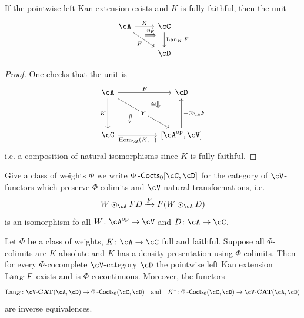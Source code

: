 \documentclass[a4paper,11pt,oneside,openany]{scrbook}
\begin{document}
\begin{lemma}
	If the pointwise left Kan extension exists and $ K $ is fully faithful, then the unit
	\begin{displaymath}
		\begin{tikzcd}
			\cA \arrow[r, "K"]\arrow[rd,"F"', 	""{name=F,marking,near start}] 	 &
			\cC \arrow[d, "{\Lan_K F}",		""{name=L,marking,above, near start}]	\\
			& \cD
			\arrow[Rightarrow, from=F, to=L, shorten <=10pt, shorten >=10pt, start anchor={north west}, end anchor={[yshift=1pt]}, "\eta_F"]
		\end{tikzcd}
	\end{displaymath}
\end{lemma}
\begin{proof}
	One checks that the unit is
	\begin{displaymath}
		\begin{tikzcd}[column sep = huge, row sep =huge]
			\cA
			\arrow[r,"F", ""{name=F, near end}]
			\arrow[d,"K"']
			\arrow[rd, "Y"description, ""{name=Y, near end}, ""{name=Z, near start}]
			&
			\cD
			\\
			\cC
			\arrow[r, "{\Hom_{\cA}(K,-)}"', ""{name=H, near start}]
			&
			\lbrack\cA^{\op},\cV\rbrack
			\arrow[u, "-\odot_\cA F"']
			\arrow[Rightarrow, from =F, to=Y, shorten <= 10pt, shorten >=10pt, "\iso"']
			\arrow[Rightarrow, from =Z, to=H, shorten <= 10pt, shorten >=10pt]
		\end{tikzcd}
	\end{displaymath}
	i.e. a composition of natural isomorphisms since $ K $ is fully faithful.
\end{proof}
\begin{defn}
	Give a class of weights $ \Phi $ we write $ \Phi\Cocts_0[\cC,\cD] $ for the category of $ \cV $-functors which preserve $ \Phi $-colimits and $ \cV $ natural transformations, i.e.
	\begin{displaymath}
		W\odot _\cA FD \xrightarrow{F}  F(W\odot_\cA D)
	\end{displaymath}
	is an isomorphism fo all $ W \from \cA ^{\op} \to \cV $ and $ D \from \cA \to \cC $.
\end{defn}
\begin{thm}
	Let $ \Phi $ be a class of weights, $ K \from \cA \to \cC $ full and faithful.
	Suppose all $ \Phi $-colimits are $ K $-absolute and $ K $ has a density presentation using $ \Phi $-colimits.
	Then for every $ \Phi $-cocomplete $ \cV $-category $ \cD $ the pointwise left Kan extension $ \operatorname{Lan}_K F $ exists and is $ \Phi $-cocontinuous.
	Moreover, the functors
	\begin{displaymath}
		\Lan_K \from \cV\text{-}\CAT(\cA,\cD) \to \Phi\Cocts_0(\cC,\cD) \quad \text{and} \quad K^*\from \Phi\Cocts_0(\cC,\cD) \to \cV\text{-}\CAT(\cA,\cD)
	\end{displaymath}
	are inverse equivalences.
\end{thm}
\end{document}
